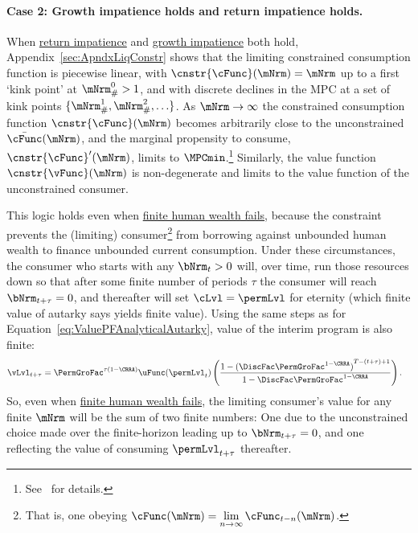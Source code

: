 \documentclass[BufferStockTheory]{subfiles}
\begin{document}
\paragraph{Case 2: Growth impatience holds and return impatience holds.}  When  \hyperlink{RIC}{return impatience} and  \hyperlink{GIC}{growth impatience} both hold, Appendix~\ref{sec:ApndxLiqConstr} shows that the limiting constrained consumption function is piecewise linear, with $\cnstr{\cFunc}(\mNrm)=\mNrm$ up to a first `kink point' at $\mNrm_{\#}^{0}>1$, and with discrete declines in the MPC at a set of kink points $\{\mNrm_{\#}^{1},\mNrm_{\#}^{2},\ldots\}$.
As $\mNrm \rightarrow \infty$ the constrained consumption function $\cnstr{\cFunc}(\mNrm)$ becomes arbitrarily close to the unconstrained $\bar{\cFunc}(\mNrm)$, and the marginal propensity to consume, $\cnstr{\cFunc}^{\prime}(\mNrm)$, limits to $\MPCmin$.\footnote{See~\cite{chkLiqConstr} for details.}  Similarly, the value function $\cnstr{\vFunc}(\mNrm)$ is non-degenerate and limits to the value function of the unconstrained consumer.


This logic holds even when \hyperlink{FHWC}{finite human wealth fails}, because the constraint prevents the (limiting) consumer\footnote{That is, one obeying $\cFunc(\mNrm) = \lim\limits_{n \rightarrow \infty} \cFunc_{t-n}(\mNrm)$.} from borrowing against unbounded human wealth to finance unbounded current consumption.
Under these circumstances, the consumer who starts with any $\bNrm_{t} > 0$ will, over time, run those resources down so that after some finite number of periods $\tau$ the consumer will reach $\bNrm_{t+\tau} = 0$, and thereafter will set $\cLvl = \permLvl$ for eternity (which \hypertarget{PFFVAC}{finite value of autarky} says yields finite value).
Using the same steps as for Equation~\eqref{eq:ValuePFAnalyticalAutarky}, value of the interim program is also finite: \hypertarget{PFFVAC}{}
\begin{align*}
  \vLvl_{t+\tau} 
  & = \PermGroFac^{\tau(1-\CRRA)} \uFunc(\permLvl_{t})\left(\frac{1-{(\DiscFac \PermGroFac^{1-\CRRA})}^{T-(t+\tau)+1}}{1-\DiscFac \PermGroFac^{1-\CRRA}}\right).
\end{align*}
So, even when \hyperlink{FHWC}{finite human wealth fails}, the limiting consumer's value for any finite $\mNrm$ will be the sum of two finite numbers: One due to the unconstrained choice made over the finite-horizon leading up to $\bNrm_{t+\tau} = 0$, and one reflecting the value of consuming $\permLvl_{t+\tau}$ thereafter.
\end{document}
